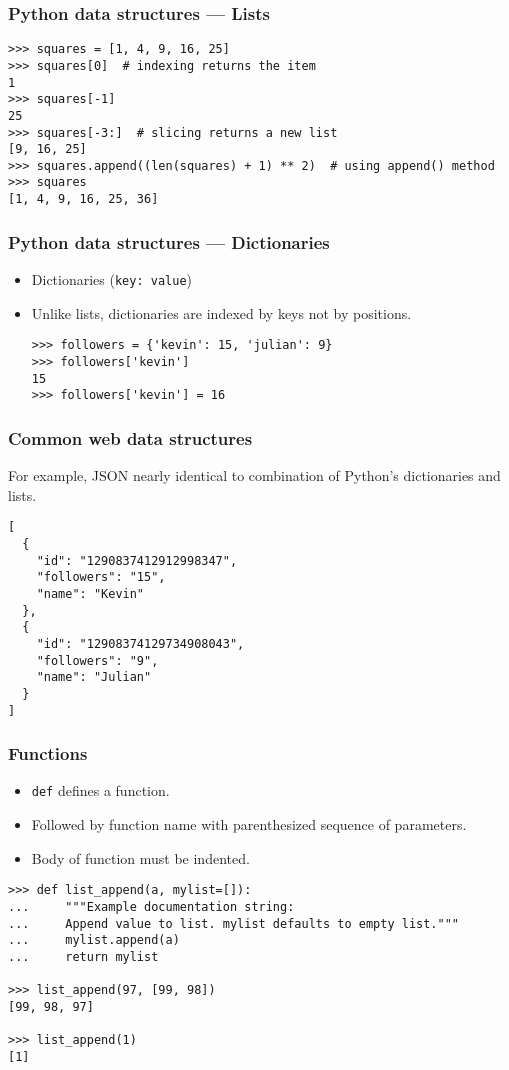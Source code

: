 \begin{frame}[fragile]
    \frametitle{Python data structures --- Lists}
\begin{verbatim}
>>> squares = [1, 4, 9, 16, 25]
>>> squares[0]  # indexing returns the item
1
>>> squares[-1]
25
>>> squares[-3:]  # slicing returns a new list
[9, 16, 25]
>>> squares.append((len(squares) + 1) ** 2)  # using append() method
>>> squares
[1, 4, 9, 16, 25, 36]
\end{verbatim}
\end{frame}

\begin{frame}[fragile]
    \frametitle{Python data structures --- Dictionaries}
    \begin{itemize}
        \item Dictionaries (\texttt{key: value})\\
        \item Unlike lists, dictionaries are indexed by keys not by positions.
\begin{verbatim}
>>> followers = {'kevin': 15, 'julian': 9}
>>> followers['kevin']
15
>>> followers['kevin'] = 16
\end{verbatim}
    \end{itemize}
\end{frame}

\begin{frame}[fragile]
    \frametitle{Common web data structures}
        For example, JSON nearly identical to combination of Python's dictionaries and lists.
\begin{verbatim}
[
  {
    "id": "1290837412912998347",
    "followers": "15",
    "name": "Kevin"
  },
  {
    "id": "12908374129734908043",
    "followers": "9",
    "name": "Julian"
  }
]
\end{verbatim}
\end{frame}

\begin{frame}[fragile]
    \frametitle{Functions}
    \begin{itemize}
        \item  \texttt{def} defines a function.
        \item Followed by function name with parenthesized sequence of parameters.
        \item Body of function must be indented.
    \end{itemize}
\begin{verbatim}
>>> def list_append(a, mylist=[]):
...     """Example documentation string:
...     Append value to list. mylist defaults to empty list."""
...     mylist.append(a)
...     return mylist

>>> list_append(97, [99, 98])
[99, 98, 97]

>>> list_append(1)
[1]
\end{verbatim}
\end{frame}

